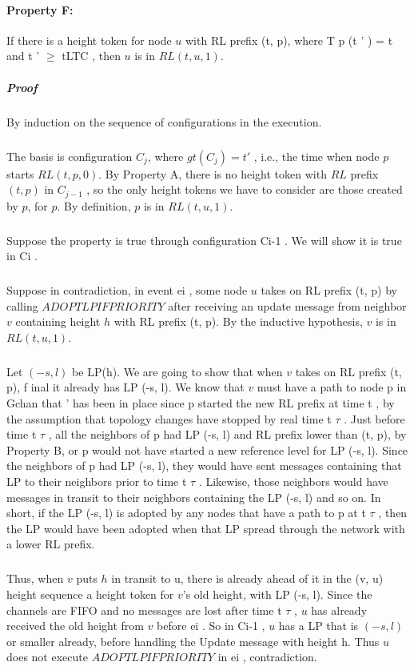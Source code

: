 \paragraph{Property F:} If there is a height token for node $u$ with RL prefix (t, p), where T p (t ' ) = t and t ' $\geq$ tLTC , then $u$ is in $RL (t, u, 1)$.
\subparagraph{Proof} By induction on the sequence of configurations in the execution.
\subparagraph{}The basis is configuration $C_j$, where $gt(C_j ) = t '$ , i.e., the time when node $p$ starts $RL (t, p, 0)$. By Property A, there is no height token with $RL$ prefix $(t, p)$ in $C_{j-1}$ , so the only height tokens we have to consider are those created by $p$, for $p$. By definition, $p$ is in $RL (t, u, 1)$.
\subparagraph{}Suppose the property is true through configuration Ci-1 . We will show it is true in Ci .
\subparagraph{}Suppose in contradiction, in event ei , some node $u$ takes on RL prefix (t, p) by calling $ADOPTLPIFPRIORITY$ after receiving an update message from neighbor $v$ containing height $h$ with RL prefix (t, p). By the inductive hypothesis, $v$ is in $RL (t, u, 1)$.
\subparagraph{}Let $(-s, l)$ be LP(h). We are going to show that when $v$ takes on RL prefix (t, p), f inal it already has LP (-s, l). We know that $v$ must have a path to node p in Gchan that ' has been in place since p started the new RL prefix at time t , by the assumption that topology changes have stopped by real time t $\tau$ . Just before time t $\tau$ , all the neighbors of p had LP (-s, l) and RL prefix lower than (t, p), by Property B, or p would not have started a new reference level for LP (-s, l). Since the neighbors of p had LP (-s, l), they would have sent messages containing that LP to their neighbors prior to time t $\tau$ . Likewise, those neighbors would have messages in transit to their neighbors containing the LP (-s, l) and so on. In short, if the LP (-s, l) is adopted by any nodes that have a path to p at t $\tau$ , then the LP would have been adopted when that LP spread through the network with a lower RL prefix. 
\subparagraph{}Thus, when $v$ puts $h$ in transit to u, there is already ahead of it in the (v, u) height sequence a height token for $v$'s old height, with LP (-s, l). Since the channels are FIFO and no messages are lost after time t $\tau$ , $u$ has already received the old height from $v$ before ei . So in Ci-1 , $u$ has a LP that is $(-s, l)$ or smaller already, before handling the Update message with height h. Thus $u$ does not execute $ADOPTLPIFPRIORITY$ in ei , contradiction.
